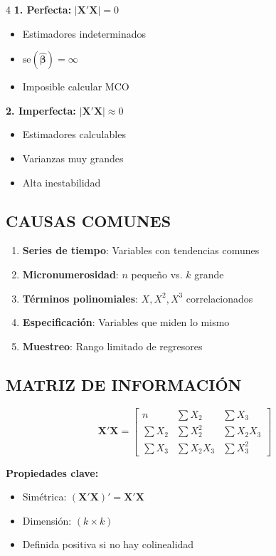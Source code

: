 \documentclass[6pt, landscape]{extarticle}
\newcommand{\Xmat}{\mathbf{X}}
\newcommand{\betahat}{\hat{\boldsymbol{\beta}}}
\begin{document}
\begin{multicols*}{4}
\textbf{1. Perfecta:} $|\Xmat'\Xmat| = 0$
\begin{itemize}
    \item Estimadores indeterminados
    \item $\text{se}(\betahat) = \infty$
    \item Imposible calcular MCO
\end{itemize}

\textbf{2. Imperfecta:} $|\Xmat'\Xmat| \approx 0$
\begin{itemize}
    \item Estimadores calculables
    \item Varianzas muy grandes
    \item Alta inestabilidad
\end{itemize}

\subsection{CAUSAS COMUNES}

\begin{enumerate}
    \item \textbf{Series de tiempo}: Variables con tendencias comunes
    \item \textbf{Micronumerosidad}: $n$ pequeño vs. $k$ grande
    \item \textbf{Términos polinomiales}: $X, X^2, X^3$ correlacionados
    \item \textbf{Especificación}: Variables que miden lo mismo
    \item \textbf{Muestreo}: Rango limitado de regresores
\end{enumerate}

\subsection{MATRIZ DE INFORMACIÓN}


\begin{formulabox}
\vspace{-3pt}
$$\Xmat'\Xmat = \begin{bmatrix}
n & \sum X_2 & \sum X_3 \\
\sum X_2 & \sum X_2^2 & \sum X_2X_3 \\
\sum X_3 & \sum X_2X_3 & \sum X_3^2
\end{bmatrix}$$
\vspace{-3pt}
\end{formulabox}

\textbf{Propiedades clave:}
\begin{itemize}
    \item Simétrica: $(\Xmat'\Xmat)' = \Xmat'\Xmat$
    \item Dimensión: $(k \times k)$
    \item Definida positiva si no hay colinealidad
\end{itemize}


\end{multicols*}
\end{document}
